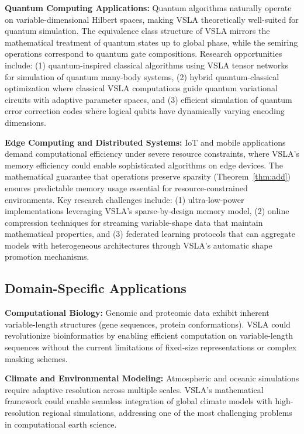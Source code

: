 \documentclass[11pt]{article}
\begin{document}
\textbf{Quantum Computing Applications:} Quantum algorithms naturally operate on variable-dimensional Hilbert spaces, making VSLA theoretically well-suited for quantum simulation. The equivalence class structure of VSLA mirrors the mathematical treatment of quantum states up to global phase, while the semiring operations correspond to quantum gate compositions. Research opportunities include: (1) quantum-inspired classical algorithms using VSLA tensor networks for simulation of quantum many-body systems, (2) hybrid quantum-classical optimization where classical VSLA computations guide quantum variational circuits with adaptive parameter spaces, and (3) efficient simulation of quantum error correction codes where logical qubits have dynamically varying encoding dimensions.

\textbf{Edge Computing and Distributed Systems:} IoT and mobile applications demand computational efficiency under severe resource constraints, where VSLA's memory efficiency could enable sophisticated algorithms on edge devices. The mathematical guarantee that operations preserve sparsity (Theorem~\ref{thm:add}) ensures predictable memory usage essential for resource-constrained environments. Key research challenges include: (1) ultra-low-power implementations leveraging VSLA's sparse-by-design memory model, (2) online compression techniques for streaming variable-shape data that maintain mathematical properties, and (3) federated learning protocols that can aggregate models with heterogeneous architectures through VSLA's automatic shape promotion mechanisms.

\subsection{Domain-Specific Applications}

\textbf{Computational Biology:} Genomic and proteomic data exhibit inherent variable-length structures (gene sequences, protein conformations). VSLA could revolutionize bioinformatics by enabling efficient computation on variable-length sequences without the current limitations of fixed-size representations or complex masking schemes.

\textbf{Climate and Environmental Modeling:} Atmospheric and oceanic simulations require adaptive resolution across multiple scales. VSLA's mathematical framework could enable seamless integration of global climate models with high-resolution regional simulations, addressing one of the most challenging problems in computational earth science.
\end{document}
